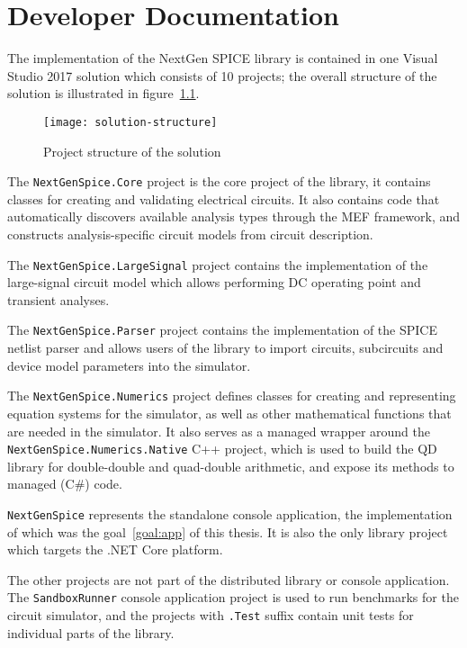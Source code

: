 \chapter{Developer Documentation}

The implementation of the NextGen SPICE library is contained in one Visual Studio 2017 solution which consists of 10 projects; the overall structure of the solution is illustrated in figure~\ref{fig:solution-structure}.

\begin{figure}[h]
	\centering
	\texttt{[image: solution-structure]}
	\caption{Project structure of the solution}
	\label{fig:solution-structure}
\end{figure}

The \texttt{NextGenSpice.Core} project is the core project of the library, it contains classes for creating and validating electrical circuits. It also contains code that automatically discovers available analysis types through the MEF framework, and constructs analysis-specific circuit models from circuit description.

The \texttt{NextGenSpice.LargeSignal} project contains the implementation of the large-signal circuit model which allows performing DC operating point and transient analyses.

The \texttt{NextGenSpice.Parser} project contains the implementation of the SPICE netlist parser and allows users of the library to import circuits, subcircuits and device model parameters into the simulator.

The \texttt{NextGenSpice.Numerics} project defines classes for creating and representing equation systems for the simulator, as well as other mathematical functions that are needed in the simulator. It also serves as a managed wrapper around the \texttt{NextGenSpice.Numerics.Native} C++ project, which is used to build the QD library for double-double and quad-double arithmetic, and expose its methods to managed (C\#) code.

\texttt{NextGenSpice} represents the standalone console application, the implementation of which was the goal~\ref{goal:app} of this thesis. It is also the only library project which targets the .NET Core platform.

The other projects are not part of the distributed library or console application. The \texttt{SandboxRunner} console application project is used to run benchmarks for the circuit simulator, and the projects with \texttt{.Test} suffix contain unit tests for individual parts of the library.

